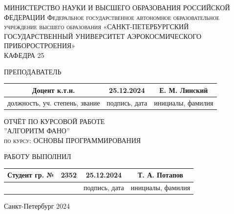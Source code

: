 \documentclass[12pt]{article}
\begin{document}
\begin{titlepage}
\newcommand{\HRule}{\rule{\linewidth}{0.2mm}}

\begin{center}
\textsc{ \centering МИНИСТЕРСТВО НАУКИ И ВЫСШЕГО ОБРАЗОВАНИЯ РОССИЙСКОЙ ФЕДЕРАЦИИ
Федеральное государственное автономное образовательное учреждение высшего образования
«САНКТ-ПЕТЕРБУРГСКИЙ ГОСУДАРСТВЕННЫЙ УНИВЕРСИТЕТ
АЭРОКОСМИЧЕСКОГО ПРИБОРОСТРОЕНИЯ»}\\[0.2cm]
\textsc{КАФЕДРА 25}\\[1cm]
\end{center}

ПРЕПОДАВАТЕЛЬ

\begin{table}[h]
\begin{center}
\begin{tabular}{|c|c|c|}
\hline
Доцент к.т.н. & 25.12.2024 & Е. М. Линский\\
\hline
должность, уч. степень, звание & подпись, дата & инициалы, фамилия\\
\hline
\end{tabular}
\end{center}
\end{table}

\begin{center}
\textsc{\Large{ОТЧЁТ ПО КУРСОВОЙ РАБОТЕ}}\\[0.5cm]
\textsc{\Large{''АЛГОРИТМ ФАНО''}}\\[2cm]
\textsc{по курсу: ОСНОВЫ ПРОГРАММИРОВАНИЯ}\\[3cm]
\end{center}

РАБОТУ ВЫПОЛНИЛ

\begin{table}[h]

\begin{center}
\begin{tabular}{|c|c|c|c|}
\hline
Студент гр. № & 2352 & 25.12.2024& Т. А. Потапов\\
\hline
& & подпись, дата & инициалы, фамилия \\
\hline
\end{tabular}
\end{center}
\end{table}

\begin{center}
{\large Санкт-Петербург 2024}
\end{center}
\end{titlepage}
\end{document}
